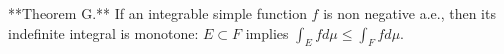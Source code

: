 **Theorem G.** If an integrable simple function $f$ is non negative a.e., then its indefinite integral is monotone: $E \subset F$ implies $\int_E f d\mu \leq \int_F f d\mu$.
